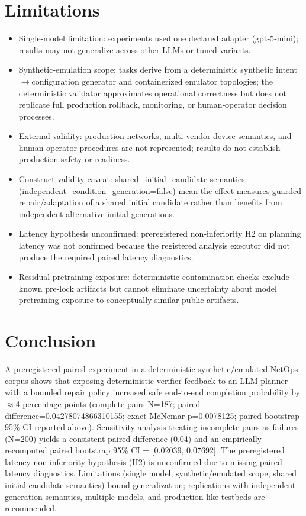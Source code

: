 \documentclass[conference]{IEEEtran}
\begin{document}
\section{Limitations}
\begin{itemize}
\item Single‑model limitation: experiments used one declared adapter (gpt‑5‑mini); results may not generalize across other LLMs or tuned variants.
\item Synthetic‑emulation scope: tasks derive from a deterministic synthetic intent\ensuremath{\rightarrow}configuration generator and containerized emulator topologies; the deterministic validator approximates operational correctness but does not replicate full production rollback, monitoring, or human‑operator decision processes.
\item External validity: production networks, multi‑vendor device semantics, and human operator procedures are not represented; results do not establish production safety or readiness.
\item Construct‑validity caveat: shared\_initial\_candidate semantics (independent\_condition\_generation=false) mean the effect measures guarded repair/adaptation of a shared initial candidate rather than benefits from independent alternative initial generations.
\item Latency hypothesis unconfirmed: preregistered non‑inferiority H2 on planning latency was not confirmed because the registered analysis executor did not produce the required paired latency diagnostics.
\item Residual pretraining exposure: deterministic contamination checks exclude known pre‑lock artifacts but cannot eliminate uncertainty about model pretraining exposure to conceptually similar public artifacts.
\end{itemize}

\section{Conclusion}
A preregistered paired experiment in a deterministic synthetic/emulated NetOps corpus shows that exposing deterministic verifier feedback to an LLM planner with a bounded repair policy increased safe end‑to‑end completion probability by \ensuremath{\approx}4 percentage points (complete pairs N=187; paired difference=0.04278074866310155; exact McNemar p=0.0078125; paired bootstrap 95\% CI reported above). Sensitivity analysis treating incomplete pairs as failures (N=200) yields a consistent paired difference (0.04) and an empirically recomputed paired bootstrap 95\% CI = [0.02039, 0.07692]. The preregistered latency non‑inferiority hypothesis (H2) is unconfirmed due to missing paired latency diagnostics. Limitations (single model, synthetic/emulated scope, shared initial candidate semantics) bound generalization; replications with independent generation semantics, multiple models, and production‑like testbeds are recommended.
\end{document}

